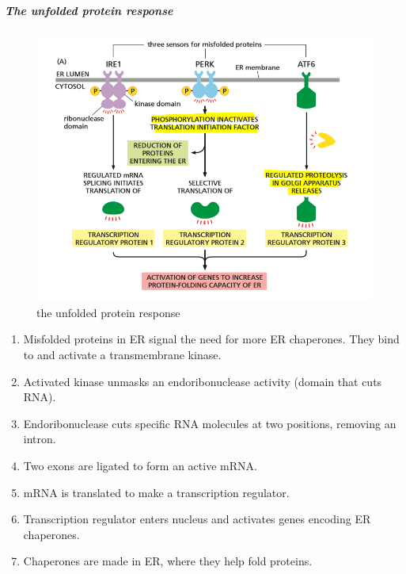 \documentclass[../main.tex]{subfiles}
\begin{document}
\subparagraph{The unfolded protein response}
\begin{figure}[H]
    \centering
    \includegraphics[width=\linewidth]{UnfoldedProteinResponse.png}
    \caption{the unfolded protein response}
    \label{fig:enter-label}
\end{figure}
\begin{enumerate}
    \item Misfolded proteins in ER signal the need for more ER chaperones. They bind to and activate a transmembrane kinase.
    \item Activated kinase unmasks an endoribonuclease activity (domain that cuts RNA).
    \item Endoribonuclease cuts specific RNA molecules at two positions, removing an intron.
    \item Two exons are ligated to form an active mRNA.
    \item mRNA is translated to make a transcription regulator.
    \item Transcription regulator enters nucleus and activates genes encoding ER chaperones.
    \item Chaperones are made in ER, where they help fold proteins.
\end{enumerate}
\end{document}
